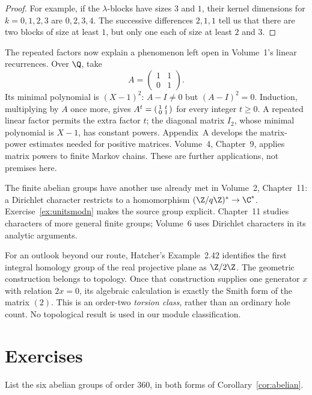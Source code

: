 \begin{proof}
For example, if the $\lambda$-blocks have sizes $3$ and $1$, their
kernel dimensions for $k=0,1,2,3$ are $0,2,3,4$. The successive
differences $2,1,1$ tell us that there are two blocks of size at least
$1$, but only one each of size at least $2$ and $3$.
\end{proof}

\begin{beauty}
The repeated factors now explain a phenomenon left open in Volume~1's
linear recurrences. Over $\Q$, take
\[
A=\begin{pmatrix}1&1\\0&1\end{pmatrix}.
\]
Its minimal polynomial is $(X-1)^2$: $A-I\ne0$ but $(A-I)^2=0$.
Induction, multiplying by $A$ once more, gives
$A^t=\begin{psmallmatrix}1&t\\0&1\end{psmallmatrix}$ for every
integer $t\ge0$. A repeated linear factor permits the extra factor $t$;
the diagonal matrix $I_2$, whose minimal polynomial is $X-1$, has
constant powers. Appendix~A develops the matrix-power estimates needed
for positive matrices. Volume~4, Chapter~9, applies matrix powers to
finite Markov chains. These are further applications, not premises here.

The finite abelian groups have another use already met in Volume~2, Chapter~11:
a Dirichlet character restricts to a homomorphism
$(\Z/q\Z)^*\to\C^*$. Exercise~\ref{ex:unitsmodn} makes the source
group explicit. Chapter~11 studies characters of more general finite
groups; Volume~6 uses Dirichlet characters in its analytic arguments.

For an outlook beyond our route, Hatcher's Example~2.42 identifies the
first integral homology group of the real projective plane as
$\Z/2\Z$. The geometric construction belongs to topology. Once that
construction supplies one generator $x$ with relation $2x=0$, its
algebraic calculation is exactly the Smith form of the matrix $(2)$.
This is an order-two \emph{torsion class}, rather than an ordinary hole
count. No topological result is used in our module classification.
\end{beauty}

\section{Exercises}

\begin{exercise}[$\star$]\label{ex:ab360}
List the six abelian groups of order $360$, in both forms of Corollary~\ref{cor:abelian}.
\end{exercise}

